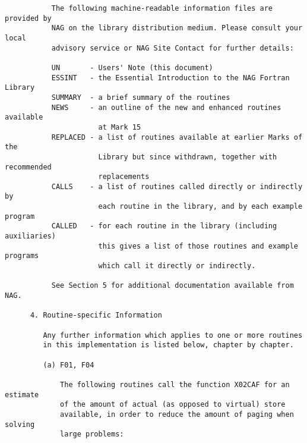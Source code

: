 \begin{small}
\begin{verbatim}
           The following machine-readable information files are provided by     
           NAG on the library distribution medium. Please consult your local    
           advisory service or NAG Site Contact for further details:            
                                                                                
           UN       - Users' Note (this document)                               
           ESSINT   - the Essential Introduction to the NAG Fortran Library     
           SUMMARY  - a brief summary of the routines                           
           NEWS     - an outline of the new and enhanced routines available     
                      at Mark 15                                                
           REPLACED - a list of routines available at earlier Marks of the      
                      Library but since withdrawn, together with recommended    
                      replacements                                              
           CALLS    - a list of routines called directly or indirectly by       
                      each routine in the library, and by each example program  
           CALLED   - for each routine in the library (including auxiliaries)   
                      this gives a list of those routines and example programs  
                      which call it directly or indirectly.                     
                                                                                
           See Section 5 for additional documentation available from NAG.       
                                                                                
      4. Routine-specific Information                                           
                                                                                
         Any further information which applies to one or more routines          
         in this implementation is listed below, chapter by chapter.            
                                                                                
         (a) F01, F04                                                           
                                                                                
             The following routines call the function X02CAF for an estimate    
             of the amount of actual (as opposed to virtual) store              
             available, in order to reduce the amount of paging when solving    
             large problems:                                                    
                                                                                

\end{verbatim}
\end{small}
